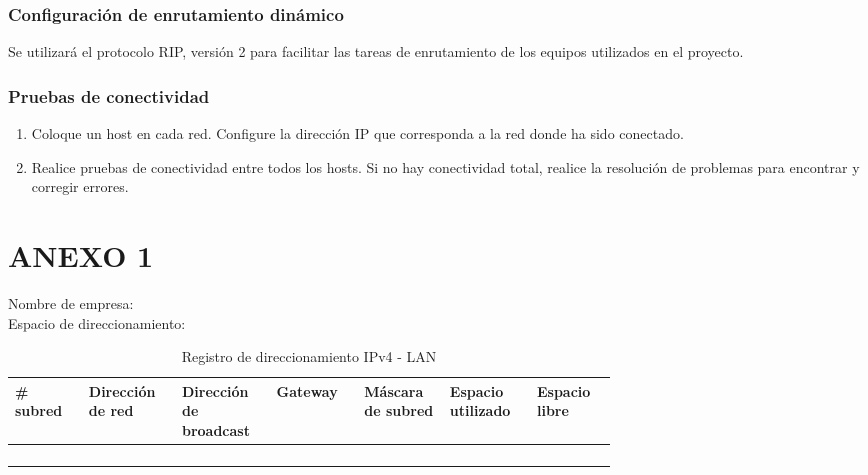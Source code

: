 \documentclass[12pt]{article}
\begin{document}
\subsubsection{Configuración de enrutamiento dinámico}
Se utilizará el protocolo RIP, versión 2 para facilitar las tareas de enrutamiento de los equipos utilizados en el proyecto.

\subsubsection{Pruebas de conectividad}
\begin{enumerate}
\item Coloque un host en cada red. Configure la dirección IP que corresponda a la red donde ha sido conectado.
\item Realice pruebas de conectividad entre todos los hosts. Si no hay conectividad total, realice la resolución de problemas para encontrar y corregir errores.
\end{enumerate}


\newpage
\section{ANEXO 1}
\noindent Nombre de empresa:\\
Espacio de direccionamiento:\\

\begin{table}[ht]
\centering
\caption{Registro de direccionamiento IPv4 -  LAN}
\begin{tabular}{|p{0.10\linewidth}|p{0.10\linewidth}|p{0.10\linewidth}|p{0.10\linewidth}|p{0.10\linewidth}|p{0.10\linewidth}|p{0.10\linewidth}|}
\hline
\rowcolor[HTML]{C0C0C0} 
\# subred & Dirección de red & Dirección de broadcast & Gateway & Máscara de subred & Espacio utilizado & Espacio libre            \\ \hline
          &                  &                        &         &                    &                   & \\ \hline
          &                  &                        &         &                    &                   & \\ \hline
          &                  &                        &         &                    &                   & \\ \hline
          &                  &                        &         &                    &                   & \\ \hline
\end{tabular}
\end{table}
\end{document}
